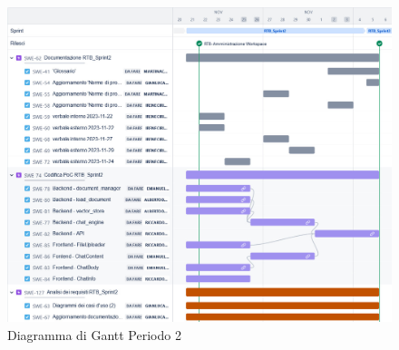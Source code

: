 \documentclass[10pt, a4paper]{article}
\begin{document}
{{{{{{{{\begin{itemize}
\end{itemize}
\vspace{1em}

 \begin{figure}[H]
        \centering        
        \includegraphics[width=15.5cm]{ganttPeriodo2.png}
        \caption{Diagramma di Gantt Periodo 2 }
    \end{figure}

}}}}}}}}
\end{document}

